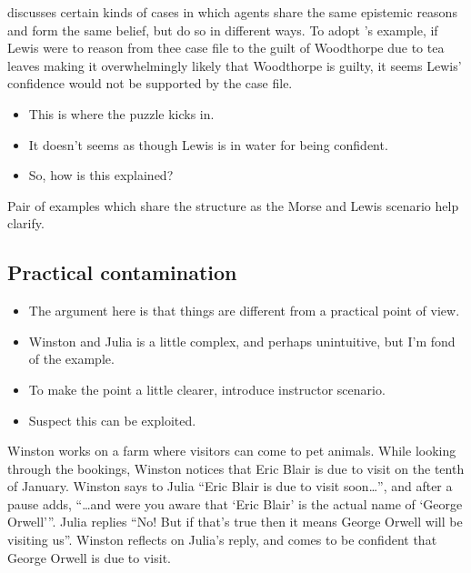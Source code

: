 \documentclass[10pt]{article}
\newcommand{\hozlinedash}[0]{%
  \noindent\hdashrule[0.5ex][c]{\textwidth}{.1pt}{2.5pt}
}
\begin{document}
\textcite{Turri:2010aa} discusses certain kinds of cases in which agents share the same {\color{red} epistemic reasons} and form the same belief, but do so in different ways.
To adopt \citeauthor{Turri:2010aa}'s example, if Lewis were to reason from thee case file to the guilt of Woodthorpe due to tea leaves making it overwhelmingly likely that Woodthorpe is guilty, it seems Lewis' confidence would not be supported by the case file.

\begin{itemize}
\item This is where the puzzle kicks in.
\item It doesn't seems as though Lewis is in water for being confident.
\item So, how is this explained?
\end{itemize}

Pair of examples which share the structure as the Morse and Lewis scenario help clarify.

\hozlinedash

\subsection{Practical contamination}
\label{sec:pract-cont}

\begin{itemize}
\item The argument here is that things are different from a practical point of view.
\item Winston and Julia is a little complex, and perhaps unintuitive, but I'm fond of the example.
\item To make the point a little clearer, introduce instructor scenario.
\item Suspect this can be exploited.
\end{itemize}

\hozlinedash

\begin{scenario}
  Winston works on a farm where visitors can come to pet animals.
  While looking through the bookings, Winston notices that Eric Blair is due to visit on the tenth of January.
  Winston says to Julia ``Eric Blair is due to visit soon\dots'', and after a pause adds, ``\dots and were you aware that `Eric Blair' is the actual name of `George Orwell'''.
  Julia replies ``No! But if that's true then it means George Orwell will be visiting us''.
  Winston reflects on Julia's reply, and comes to be confident that George Orwell is due to visit.
\end{scenario}
\end{document}
